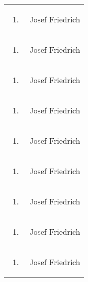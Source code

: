 \begin{flushleft}
\begin{supertabular}{m{1.2409999cm}m{14.604cm}}
\begin{enumerate}
\item
\end{enumerate}
 &
Josef Friedrich\\
\begin{enumerate}
\item
\end{enumerate}
 &
Josef Friedrich\\
\begin{enumerate}
\item
\end{enumerate}
 &
Josef Friedrich\\
\begin{enumerate}
\item
\end{enumerate}
 &
Josef Friedrich\\
\begin{enumerate}
\item
\end{enumerate}
 &
Josef Friedrich\\
\begin{enumerate}
\item
\end{enumerate}
 &
Josef Friedrich\\
\begin{enumerate}
\item
\end{enumerate}
 &
Josef Friedrich\\
\begin{enumerate}
\item
\end{enumerate}
 &
Josef Friedrich\\
\begin{enumerate}
\item
\end{enumerate}
 &
Josef Friedrich\\
\end{supertabular}
\end{flushleft}